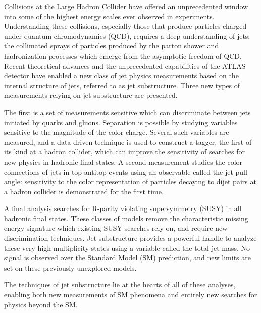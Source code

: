 Collisions at the Large Hadron Collider have offered an unprecedented window into some of the highest energy scales ever observed in experiments. Understanding these collisions, especially those that produce particles charged under quantum chromodynamics (QCD), requires a deep understanding of jets: the collimated sprays of particles produced by the parton shower and hadronization processes which emerge from the asymptotic freedom of QCD. Recent theoretical advances and the unprecedented capabilities of the ATLAS detector have enabled a new class of jet physics measurements based on the internal structure of jets, referred to as jet substructure.
Three new types of measurements relying on jet substructure are presented.

The first is a set of measurements sensitive which can discriminate between jets initiated by quarks and gluons. Separation is possible by studying variables sensitive to the magnitude of the color charge. Several such variables are measured, and a data-driven technique is used to construct a tagger, the first of its kind at a hadron collider, which can improve the sensitivity of searches for new physics in hadronic final states. A second measurement studies the color connections of jets in top-antitop events using an observable called the jet pull angle: sensitivity to the color representation of particles decaying to dijet pairs at a hadron collider is demonstrated for the first time.

A final analysis searches for R-parity violating supersymmetry (SUSY) in all hadronic final states. These classes of models remove the characteristic missing energy signature which existing SUSY searches rely on, and require new discrimination techniques. Jet substructure provides a powerful handle to analyze these very high multiplicity states using a variable called the total jet mass. No signal is observed over the Standard Model (SM) prediction, and new limits are set on these previously unexplored models.

The techniques of jet substructure lie at the hearts of all of these analyses, enabling both new measurements of SM phenomena and entirely new searches for physics beyond the SM.